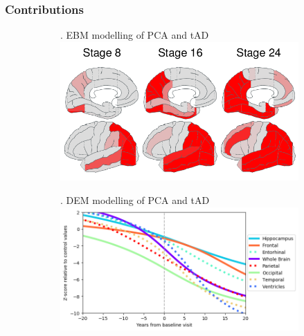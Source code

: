 \documentclass[10pt,xcolor=table]{beamer}
\begin{document}

\begin{frame}
\frametitle{Contributions}


\vspace{-1em}
\begin{figure}
\centering
\begin{subfigure}{0.47\textwidth}
. EBM modelling of PCA and tAD\\
\includegraphics[scale=0.15]{ebm_thumb.png}
\end{subfigure}
\begin{subfigure}{0.47\textwidth}
. DEM  modelling of PCA and tAD\\
\includegraphics[scale=0.15]{../images/dem/mriSmallSebPaper_DEMStdPCA_trajAlign.png}
\end{subfigure}


\end{figure}
\end{frame}
\end{document}
